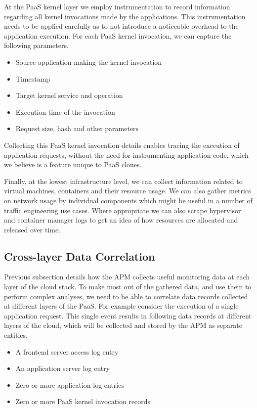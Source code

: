 \documentclass[11pt]{article}
\begin{document}
At the PaaS kernel layer we employ instrumentation to record information regarding all kernel invocations
made by the applications. This instrumentation needs to be applied carefully as to not introduce a noticeable
overhead to the application execution. For each PaaS kernel invocation, we can capture the 
following parameters.
\begin{itemize}
\item Source application making the kernel invocation
\item Timestamp
\item Target kernel service and operation
\item Execution time of the invocation
\item Request size, hash and other parameters
\end{itemize}
Collecting this PaaS kernel invocation details enables tracing the execution of application 
requests, without the need for instrumenting application code, which we believe is a feature 
unique to PaaS cloues. 

Finally, at the lowest infrastructure level, we can collect information related to virtual machines, containers
and their resource usage. We can also gather metrics on network usage by individual components which
might be useful in a number of traffic engineering use cases. Where appropriate we can also scrape
hypervisor and container manager logs to get an idea of how resources are allocated and released over
time.

\subsection{Cross-layer Data Correlation}
Previous subsection details how the APM collects useful monitoring data at each layer of the cloud
stack. To make most out of the gathered data, and use them to perform complex analyses, we need
to be able to correlate data records collected at different layers of the PaaS. For example consider
the execution of a single application request. This single event results in following data records at
different layers of the cloud, which will be collected and stored by the APM as separate entities.

\begin{itemize}
\item A frontend server access log entry
\item An application server log entry
\item Zero or more application log entries
\item Zero or more PaaS kernel invocation records
\end{itemize}
\end{document}
